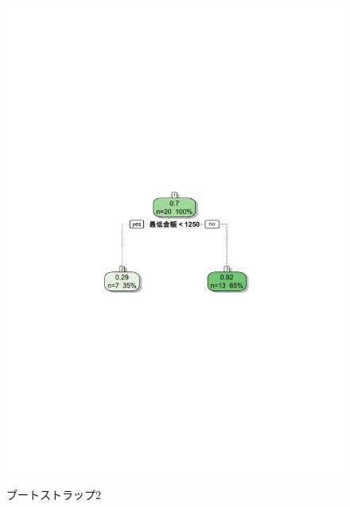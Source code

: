 \begin{figure}[H]
\centering
\includegraphics[width=13cm]{figure39.pdf}
\caption{ブートストラップ2}\label{sannp}
\end{figure}

